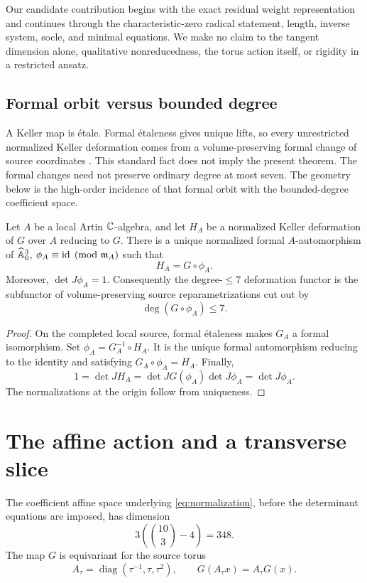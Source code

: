 \documentclass[11pt,reqno]{amsart}
\begin{document}
Our candidate contribution begins with the exact residual weight
representation and continues through the characteristic-zero radical
statement, length, inverse system, socle, and minimal equations.  We make no
claim to the tangent dimension alone, qualitative nonreducedness, the torus
action itself, or rigidity in a restricted ansatz.

\subsection*{Formal orbit versus bounded degree}

A Keller map is \'{e}tale.  Formal \'{e}taleness gives unique lifts, so every
unrestricted normalized Keller deformation comes from a volume-preserving
formal change of source coordinates \cite{stacks02HF}.  This standard fact
does not imply the present theorem.  The formal changes need not preserve
ordinary degree at most seven.  The geometry below is the high-order
incidence of that formal orbit with the bounded-degree coefficient space.

\begin{proposition}
\label{prop:formal-orbit}
Let \(A\) be a local Artin \(\mathbb C\)-algebra, and let \(H_A\) be a normalized
Keller deformation of \(G\) over \(A\) reducing to \(G\).  There is a unique
normalized formal \(A\)-automorphism of \(\widehat{\mathbb A}^3_0\),
\(\phi_A\equiv\operatorname{id}\pmod{\mathfrak m_A}\) such that
\[
H_A=G\circ\phi_A.
\]
Moreover, \(\det J\phi_A=1\).  Consequently the degree-\(\le7\)
deformation functor is the subfunctor of volume-preserving source
reparametrizations cut out by
\[
\deg(G\circ\phi_A)\le7.
\]
\end{proposition}

\begin{proof}
On the completed local source, formal \'{e}taleness makes \(G_A\) a formal
isomorphism.  Set \(\phi_A=G_A^{-1}\circ H_A\).  It is the unique formal
automorphism reducing to the identity and satisfying
\(G_A\circ\phi_A=H_A\).  Finally,
\[
1=\det JH_A=\det JG(\phi_A)\det J\phi_A=\det J\phi_A.
\]
The normalizations at the origin follow from uniqueness.
\end{proof}

\section{The affine action and a transverse slice}
\label{sec:slice}

The coefficient affine space underlying \eqref{eq:normalization}, before the
determinant equations are imposed, has dimension
\[
3\left(\binom{10}{3}-4\right)=348.
\]
The map \(G\) is equivariant for the source torus
\begin{equation}
\label{eq:torus}
A_\tau=\operatorname{diag}(\tau^{-1},\tau,\tau^2),
\qquad
G(A_\tau x)=A_\tau G(x).
\end{equation}
\end{document}
